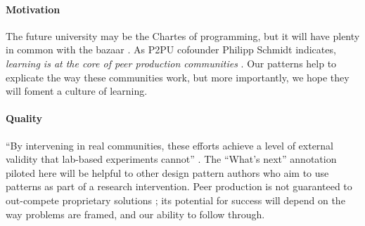 \begin{refsection}
\paragraph{Motivation}  The future university may be
the Chartes of programming, but it will have plenty in common with the
bazaar \cite{raymond2001cathedral}.  As P2PU cofounder Philipp Schmidt
indicates, \emph{learning is at the core of peer production
  communities} \cite{schmidt+commons-based+2009}.  Our patterns help
to explicate the way these communities work, but more importantly,
we hope they will foment a culture of learning.

\paragraph{Quality} 
``By intervening in real communities, these efforts achieve a level of
external validity that lab-based experiments cannot''
\cite{benkler2015peer}.  The ``What's next'' annotation piloted here
will be helpful to other design pattern authors who aim to use
patterns as part of a research intervention.  Peer production is not guaranteed to
  out-compete proprietary solutions
\cite{benkler2015peer,free-software-better}; its potential for
success will depend on the way problems are framed,
and our ability to follow through.

\printbibliography[heading=subbibliography]

\end{refsection}
